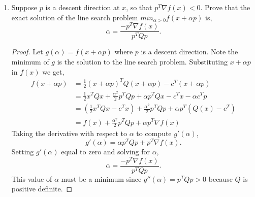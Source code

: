 \documentclass[12pt]{article}
\makeatletter
\theoremstyle{homework}
\newenvironment{exercise}[1]
{\def\@currentlabel{#1}\exercisecore}
{\endexercisecore}
\makeatother
\begin{document}
\begin{exercise}{P13}
\begin{enumerate}
      \item[(c)] Suppose $p$ is a descent direction at $x$, so that $p^T \nabla f(x) < 0$. Prove that the exact solution of the line search problem 
      $min_{\alpha > 0}f(x + \alpha p)$ is, 
      \begin{equation*}
        \alpha = \frac{-p^T\nabla f(x)}{p^TQp}.
      \end{equation*}
      \begin{proof} Let $g(\alpha) = f(x + \alpha p)$ where $p$ is a descent direction. Note the minimum of $g$ is the solution to the line search problem. 
        Substituting $x + \alpha p$ in $f(x)$ we get, 
        \begin{align*}
          f(x + \alpha p) &= \frac{1}{2}(x + \alpha p)^TQ(x + \alpha p) - c^T(x + \alpha p)\\
          &= \frac{1}{2}x^TQx + \frac{\alpha^2}{2}p^TQp + \alpha p^TQx - c^Tx - \alpha c^Tp\\
          &= (\frac{1}{2}x^TQx - c^Tx) + \frac{\alpha^2}{2}p^TQp + \alpha p^T(Q(x) - c^T)\\
          &= f(x) + \frac{\alpha^2}{2}p^TQp + \alpha p^T\nabla f(x)
        \end{align*}
        Taking the derivative with respect to $\alpha$ to compute $g'(\alpha)$,
        \begin{equation*}
          g'(\alpha) = \alpha p^TQp + p^T\nabla f(x).
        \end{equation*}
        Setting $g'(\alpha)$ equal to zero and solving for $\alpha$, 
        \begin{equation*}
          \alpha = \frac{-p^T\nabla f(x)}{p^TQp}.
        \end{equation*}
        This value of $\alpha$ must be a minimum since $g''(\alpha) = p^TQp > 0$ because $Q$ is positive definite. 
      \end{proof}
  \end{enumerate}
  
\end{exercise}
\vspace{.5in}
\end{document}

